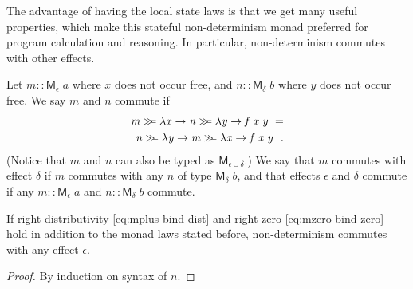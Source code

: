 \documentclass{llncs}
\newcommand{\Conid}[1]{\mathit{#1}}
\newcommand{\Varid}[1]{\mathit{#1}}
\let\Varid\mathit
\let\Conid\mathsf
\begin{document}
The advantage of having the local state laws is that we get many useful properties, which make this stateful non-determinism monad preferred for program calculation and reasoning.
In particular, non-determinism commutes with other effects.
\begin{definition}
Let \ensuremath{\Varid{m}\mathbin{::}\Conid{M}_{\epsilon}\;\Varid{a}} where \ensuremath{\Varid{x}} does not occur free, and \ensuremath{\Varid{n}\mathbin{::}\Conid{M}_{\delta}\;\Varid{b}} where \ensuremath{\Varid{y}} does not occur free. We say \ensuremath{\Varid{m}} and \ensuremath{\Varid{n}} commute if
\begin{equation} \label{eq:commute}
\begin{split}
  \ensuremath{\Varid{m}\mathrel{\hstretch{0.7}{>\!\!>\!\!=}}\lambda \Varid{x}\to \Varid{n}\mathrel{\hstretch{0.7}{>\!\!>\!\!=}}\lambda \Varid{y}\to \Varid{f}\;\Varid{x}\;\Varid{y}~\mathrel{=}}\\
   \ensuremath{\Varid{n}\mathrel{\hstretch{0.7}{>\!\!>\!\!=}}\lambda \Varid{y}\to \Varid{m}\mathrel{\hstretch{0.7}{>\!\!>\!\!=}}\lambda \Varid{x}\to \Varid{f}\;\Varid{x}\;\Varid{y}~~.}
\end{split}
\end{equation}
(Notice that \ensuremath{\Varid{m}} and \ensuremath{\Varid{n}} can also be typed as \ensuremath{\Conid{M}_{\epsilon\mathbin{\cup}\delta}}.) We say that \ensuremath{\Varid{m}} commutes with effect \ensuremath{\delta} if \ensuremath{\Varid{m}} commutes with any \ensuremath{\Varid{n}} of type \ensuremath{\Conid{M}_{\delta}\;\Varid{b}}, and that effects \ensuremath{\epsilon} and \ensuremath{\delta} commute if any \ensuremath{\Varid{m}\mathbin{::}\Conid{M}_{\epsilon}\;\Varid{a}} and \ensuremath{\Varid{n}\mathbin{::}\Conid{M}_{\delta}\;\Varid{b}} commute.
\end{definition}

\begin{theorem} \label{thm:nondet-commute}
If right-distributivity \eqref{eq:mplus-bind-dist} and right-zero \eqref{eq:mzero-bind-zero} hold
in addition to the monad laws stated before, non-determinism commutes with any effect \ensuremath{\epsilon}.
\end{theorem}
\begin{proof} By induction on syntax of \ensuremath{\Varid{n}}.
\end{proof}
\end{document}
